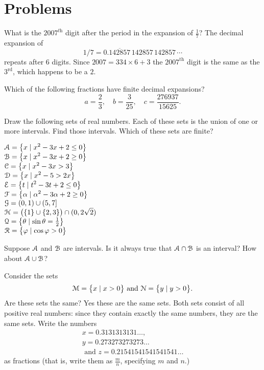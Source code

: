 \section{Problems} 
\problemfont 
\begin{multicols}{2}\setlength{\parindent}{0pt}
\problem What is the $2007^{\textit{th}}$ digit after the period in the expansion 
of $\frac17$?
\answer 
The decimal expansion of
\[
1/7 = 0.\overline{142857}\,142857\,142857\,\cdots
\]
repeats after 6 digits.  Since $2007 =
334\times6+3$ the $2007^{\textrm{th}}$ digit is the same as the
$3^{\textrm{rd}}$, which happens to be a $2$.
\endanswer



\problem Which of the following fractions have finite decimal expansions? 
\[
a=\frac 23, \quad b=\frac 3{25},\quad c=\frac{276937}{15625}.
\]


\problem Draw the following sets of real numbers.  Each of these sets is 
the union of one or more intervals.  Find those intervals.  Which of these
sets are finite?



\noindent%
\(\displaystyle\mathcal{A} = \bigl\{x \mid x^2-3x+2\leq 0\bigr\} \)\\
\(\displaystyle\mathcal{B} = \bigl\{x \mid x^2-3x+2\geq 0\bigr\}\)\\
\(\displaystyle\mathcal{C} = \bigl\{x \mid x^2-3x > 3\bigr\} \)\\
\(\displaystyle\mathcal{D} = \bigl\{x \mid x^2-5>2x\bigr\} \)\\
\(\displaystyle\mathcal{E} = \bigl\{t \mid t^2-3t+2\leq0\bigr\} \)\\
\(\displaystyle\mathcal{F} = \bigl\{\alpha \mid \alpha^2-3\alpha+2\geq 0\bigr\}\)\\
\(\displaystyle\mathcal{G} = (0, 1)\cup (5, 7] \)\\
\(\displaystyle\mathcal{H} = \bigl( \{1\}\cup\{2,3\} \bigr)\cap (0, 2\sqrt2)\)\\
\(\displaystyle\mathcal{Q} = \bigl\{\theta \mid \sin\theta=\tfrac12\bigr\} \)\\
\(\displaystyle\mathcal{R} = \bigl\{\varphi\mid \cos\varphi>0\bigr\}\)
    


\problem Suppose $\mathcal{A}$ and $\mathcal{B}$ are intervals.  Is it always true that 
$\mathcal{A}\cap\mathcal{B}$ is an interval?  How about $\mathcal{A}\cup\mathcal{B}$?







\problem Consider the sets 
\[
\mathcal{M} = \bigl\{x \mid x>0\bigr\} \text{ and }
\mathcal{N} =  \bigl\{y \mid y>0\bigr\}.
\]
Are these sets the same?
\answer 
Yes these are the same sets.  Both sets consist of all positive real
numbers: since they contain exactly the same numbers, they are the
same sets.
\endanswer
\problem \groupproblem 
Write the numbers
\begin{gather*}
  x=0.3131313131\dots,\\
  y=0.273273273273\dots\\
  \text{ and }
  z=0.21541541541541541\dots
\end{gather*}
as fractions (that is, write them as $\frac mn$, specifying $m$ and
$n$.)



\end{multicols}
